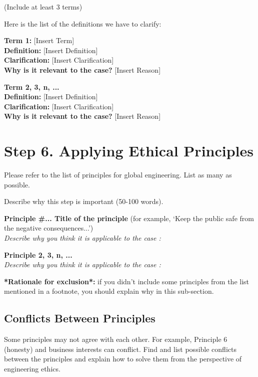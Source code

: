 \documentclass[12pt,a4paper]{article}
\begin{document}
\vspace{0.3cm}
\noindent (Include at least 3 terms)

\noindent Here is the list of the definitions we have to clarify:

\vspace{0.3cm}
\noindent\textbf{Term 1: } [Insert Term]\\
\textbf{Definition: } [Insert Definition]\\
\textbf{Clarification: } [Insert Clarification]\\
\textbf{Why is it relevant to the case?} [Insert Reason]

\vspace{0.3cm}
\noindent\textbf{Term 2, 3, n, ...}\\
\textbf{Definition: } [Insert Definition]\\
\textbf{Clarification: } [Insert Clarification]\\
\textbf{Why is it relevant to the case?} [Insert Reason]

\section{Step 6. Applying Ethical Principles}
Please refer to the list of principles for global engineering. List as many as possible.

\vspace{0.3cm}
\noindent Describe why this step is important (50-100 words).

\vspace{0.3cm}
\noindent\textbf{Principle \#... Title of the principle} (for example, ‘Keep the public safe from the negative consequences...’)\\
\textit{Describe why you think it is applicable to the case :} 

\vspace{0.3cm}
\noindent\textbf{Principle 2, 3, n, ...} \\
\textit{Describe why you think it is applicable to the case :} 

\vspace{0.3cm}
\noindent\textbf{*Rationale for exclusion*:} if you didn’t include some principles from the list mentioned in a footnote, you should explain why in this sub-section.

\subsection*{Conflicts Between Principles}
Some principles may not agree with each other. For example, Principle 6 (honesty) and business interests can conflict. Find and list possible conflicts between the principles and explain how to solve them from the perspective of engineering ethics.
\end{document}
